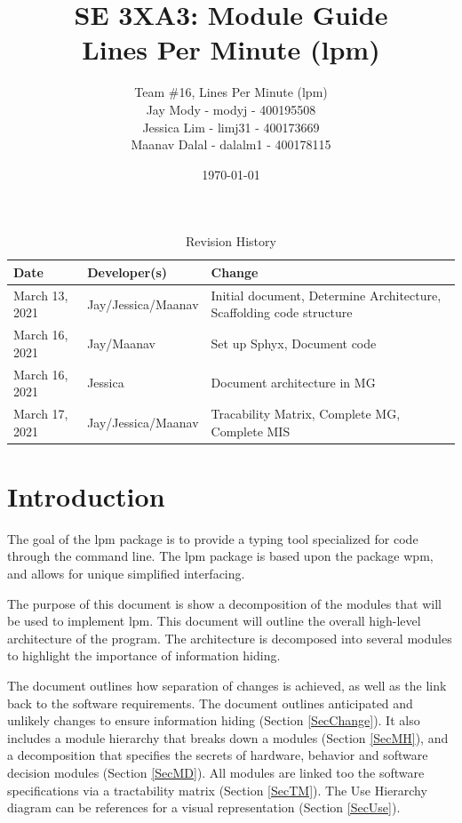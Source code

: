 \documentclass[12pt, titlepage]{article}
\title{\textbf{SE 3XA3: Module Guide}\\Lines Per Minute (lpm)}
\author{Team \#16, Lines Per Minute (lpm)\\
Jay Mody - modyj - 400195508\\
Jessica Lim - limj31 - 400173669\\
Maanav Dalal - dalalm1 - 400178115\\
}
\date{\today}
\begin{document}
\maketitle
\begin{table}[hp]
\caption{Revision History} \label{TblRevisionHistory}
\begin{tabularx}{\textwidth}{llX}
\toprule
\textbf{Date} & \textbf{Developer(s)} & \textbf{Change}\\
\midrule
March 13, 2021 & Jay/Jessica/Maanav & Initial document, Determine Architecture, Scaffolding code structure \\
\midrule
March 16, 2021 & Jay/Maanav & Set up Sphyx, Document code \\
\midrule
March 16, 2021 & Jessica & Document architecture in MG \\
\midrule
March 17, 2021 & Jay/Jessica/Maanav & Tracability Matrix, Complete MG, Complete MIS \\
\bottomrule
\end{tabularx}
\end{table}

\newpage

\tableofcontents
\listoftables
\listoffigures



\newpage


\section{Introduction}

The goal of the lpm package is to provide a typing tool specialized for code through the command line. The lpm package is based upon the package wpm, and allows for unique simplified interfacing.

The purpose of this document is show a decomposition of the modules that will be used to implement lpm. This document will outline the overall high-level architecture of the program. The architecture is decomposed into several modules to highlight the importance of information hiding.

The document outlines how separation of changes is achieved, as well as the link back to the software requirements. The document outlines anticipated and unlikely changes to ensure information hiding (Section \ref{SecChange}). It also includes a module hierarchy that breaks down a modules (Section \ref{SecMH}), and a decomposition that specifies the secrets of hardware, behavior and software decision modules (Section \ref{SecMD}). All modules are linked too the software specifications via a tractability matrix (Section \ref{SecTM}). The Use Hierarchy diagram can be references for a visual representation (Section \ref{SecUse}).
\end{document}
